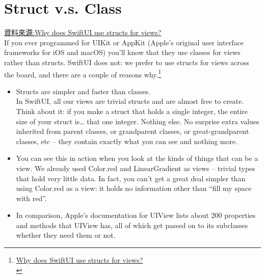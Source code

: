 \documentclass[a4paper,12pt]{article}
\begin{document}
\section{Struct v.s. Class}
\label{sec:orgfcc22b5}
\href{https://www.hackingwithswift.com/books/ios-swiftui/why-does-swiftui-use-structs-for-views}{資料來源:Why does SwiftUI use structs for views?}\\
If you ever programmed for UIKit or AppKit (Apple’s original user interface frameworks for iOS and macOS) you’ll know that they use classes for views rather than structs. SwiftUI does not: we prefer to use structs for views across the board, and there are a couple of reasons why.\footnote{\href{https://www.hackingwithswift.com/books/ios-swiftui/why-does-swiftui-use-structs-for-views}{Why does SwiftUI use structs for views?}\\}\\
\begin{itemize}
\item Structs are simpler and faster than classes.\\
In SwiftUI, all our views are trivial structs and are almost free to create. Think about it: if you make a struct that holds a single integer, the entire size of your struct is… that one integer. Nothing else. No surprise extra values inherited from parent classes, or grandparent classes, or great-grandparent classes, etc – they contain exactly what you can see and nothing more.\\

\item You can see this in action when you look at the kinds of things that can be a view. We already used Color.red and LinearGradient as views – trivial types that hold very little data. In fact, you can’t get a great deal simpler than using Color.red as a view: it holds no information other than “fill my space with red”.\\

\item In comparison, Apple’s documentation for UIView lists about 200 properties and methods that UIView has, all of which get passed on to its subclasses whether they need them or not.\\
\end{itemize}
\end{document}
